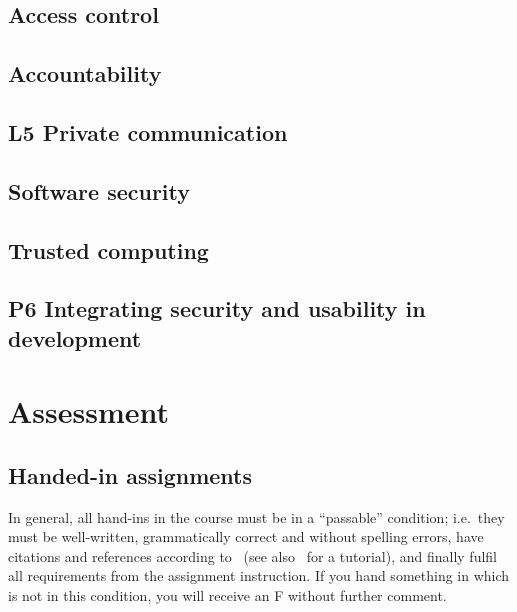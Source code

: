 \subsection{Access control}


\subsection{Accountability}


\subsection{L5 Private communication}


\subsection{Software security}


\subsection{Trusted computing}


\subsection{P6 Integrating security and usability in development}



\section{Assessment}%
\label{Assessment}


\subsection{Handed-in assignments}

In general, all hand-ins in the course must be in a \enquote{passable} 
condition; i.e.~they must be well-written, grammatically correct and without 
spelling errors, have citations and references according to~\cite{IEEEcitation} 
(see also~\cite{PurdueCitation} for a tutorial), and finally fulfil all 
requirements from the assignment instruction.
If you hand something in which is not in this condition, you will receive an 
F without further comment.

